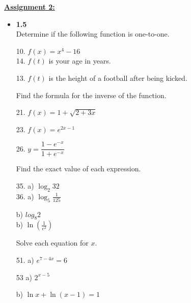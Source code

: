 \documentclass{letter}
\begin{document}
	\clearpage
	\large\underline{\textbf{Assignment 2:}}
	\begin{itemize}
		\item[] \textbf{1.5}\\
		
		Determine if the following function is one-to-one.\\
		\begin{minipage}[t]{0.6\textwidth}
			10. $f(x) = x^4 - 16$\\
			14. $f(t)$ is your age in years.\\
		\end{minipage}
		\begin{minipage}[t]{0.3\textwidth}
			13. $f(t)$ is the height of a football after being kicked.\\
		\end{minipage}
		
		Find the formula for the inverse of the function.\\
		\begin{minipage}[t]{0.3\textwidth}
			21. $f(x) = 1 + \sqrt{2+3x}$
		\end{minipage}
		\begin{minipage}[t]{0.3\textwidth}
			23. $f(x) = e^{2x-1}$
		\end{minipage}
		\begin{minipage}[t]{0.3\textwidth}
			26. $y = \dfrac{1-e^{-x}}{1+e^{-x}}$\\
		\end{minipage}
		
		Find the exact value of each expression.\\
		\begin{minipage}[t]{0.3\textwidth}
			35. a) $\log_2 32$\\
			36. a) $\log_5 \frac{1}{125}$
		\end{minipage}
		\begin{minipage}[t]{0.3\textwidth}
			b) $log_8 2$\\
			b) $\ln(\frac{1}{e^2})$\\
		\end{minipage}
		
		Solve each equation for $x$.\\
		\begin{minipage}[t]{0.3\textwidth}
			51. a) $e^{7-4x} = 6$
		\end{minipage}
		\begin{minipage}[t]{0.3\textwidth}
			53 a) $2^{x-5}$
		\end{minipage}
		\begin{minipage}[t]{0.3\textwidth}
			b) $\ln x + \ln(x-1) = 1$\\
		\end{minipage}\\
		

\end{itemize}
\end{document}
